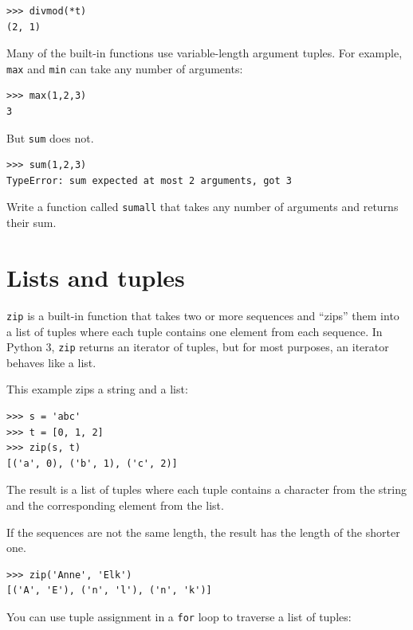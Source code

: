 \documentclass[10pt]{book}
\begin{document}
\begin{verbatim}
>>> divmod(*t)
(2, 1)
\end{verbatim}
%
\begin{exercise}

Many of the built-in functions use
variable-length argument tuples.  For example, {\tt max}
and {\tt min} can take any number of arguments:

\begin{verbatim}
>>> max(1,2,3)
3
\end{verbatim}
%
But {\tt sum} does not.

\begin{verbatim}
>>> sum(1,2,3)
TypeError: sum expected at most 2 arguments, got 3
\end{verbatim}
%
Write a function called {\tt sumall} that takes any number
of arguments and returns their sum.

\end{exercise}


\section{Lists and tuples}

{\tt zip} is a built-in function that takes two or more sequences and
``zips'' them into a list of tuples where each tuple contains one
element from each sequence.  In Python 3, {\tt zip} returns an iterator
of tuples, but for most purposes, an iterator behaves like a list.

This example zips a string and a list:

\begin{verbatim}
>>> s = 'abc'
>>> t = [0, 1, 2]
>>> zip(s, t)
[('a', 0), ('b', 1), ('c', 2)]
\end{verbatim}
%
The result is a list of tuples where each tuple contains
a character from the string and the corresponding element from
the list.

If the sequences are not the same length, the result has the
length of the shorter one.

\begin{verbatim}
>>> zip('Anne', 'Elk')
[('A', 'E'), ('n', 'l'), ('n', 'k')]
\end{verbatim}
%
You can use tuple assignment in a {\tt for} loop to traverse a list of
tuples:
\end{document}
